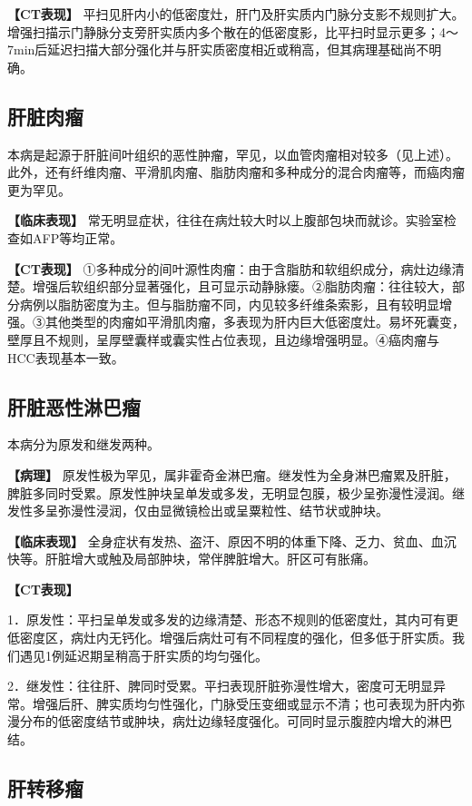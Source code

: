 \textbf{【CT表现】}
平扫见肝内小的低密度灶，肝门及肝实质内门脉分支影不规则扩大。增强扫描示门静脉分支旁肝实质内多个散在的低密度影，比平扫时显示更多；4～7min后延迟扫描大部分强化并与肝实质密度相近或稍高，但其病理基础尚不明确。

\subsection{肝脏肉瘤}

本病是起源于肝脏间叶组织的恶性肿瘤，罕见，以血管肉瘤相对较多（见上述）。此外，还有纤维肉瘤、平滑肌肉瘤、脂肪肉瘤和多种成分的混合肉瘤等，而癌肉瘤更为罕见。

\textbf{【临床表现】}
常无明显症状，往往在病灶较大时以上腹部包块而就诊。实验室检查如AFP等均正常。

\textbf{【CT表现】}
①多种成分的间叶源性肉瘤：由于含脂肪和软组织成分，病灶边缘清楚。增强后软组织部分显著强化，且可显示动静脉瘘。②脂肪肉瘤：往往较大，部分病例以脂肪密度为主。但与脂肪瘤不同，内见较多纤维条索影，且有较明显增强。③其他类型的肉瘤如平滑肌肉瘤，多表现为肝内巨大低密度灶。易坏死囊变，壁厚且不规则，呈厚壁囊样或囊实性占位表现，且边缘增强明显。④癌肉瘤与HCC表现基本一致。

\subsection{肝脏恶性淋巴瘤}

本病分为原发和继发两种。

\textbf{【病理】}
原发性极为罕见，属非霍奇金淋巴瘤。继发性为全身淋巴瘤累及肝脏，脾脏多同时受累。原发性肿块呈单发或多发，无明显包膜，极少呈弥漫性浸润。继发性多呈弥漫性浸润，仅由显微镜检出或呈粟粒性、结节状或肿块。

\textbf{【临床表现】}
全身症状有发热、盗汗、原因不明的体重下降、乏力、贫血、血沉快等。肝脏增大或触及局部肿块，常伴脾脏增大。肝区可有胀痛。

\textbf{【CT表现】}

1．原发性：平扫呈单发或多发的边缘清楚、形态不规则的低密度灶，其内可有更低密度区，病灶内无钙化。增强后病灶可有不同程度的强化，但多低于肝实质。我们遇见1例延迟期呈稍高于肝实质的均匀强化。

2．继发性：往往肝、脾同时受累。平扫表现肝脏弥漫性增大，密度可无明显异常。增强后肝、脾实质均匀性强化，门脉受压变细或显示不清；也可表现为肝内弥漫分布的低密度结节或肿块，病灶边缘轻度强化。可同时显示腹腔内增大的淋巴结。

\subsection{肝转移瘤}

